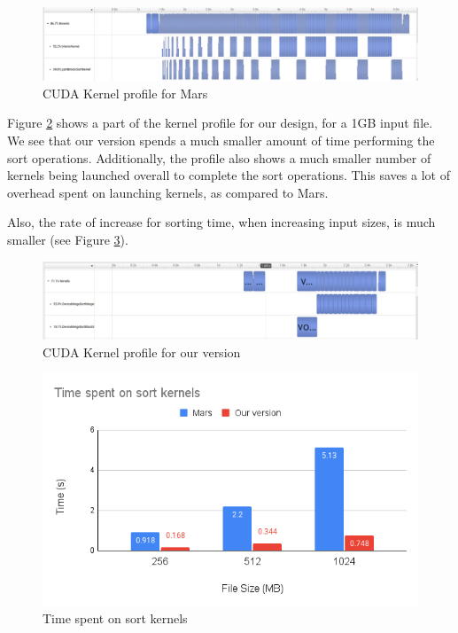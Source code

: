 \documentclass{article}
\begin{document}
\begin{figure}
    \centering
    \includegraphics[width=1\linewidth]{images/mr-mars-kernels.png}
    \caption{CUDA Kernel profile for Mars}
    \label{fig:mr-mars-kernels}
\end{figure}

Figure \ref{fig:mr-our-kernels} shows a part of the kernel profile for our design, for a 1GB input file. We see that our version spends a much smaller amount of time performing the sort operations. Additionally, the profile also shows a much smaller number of kernels being launched overall to complete the sort operations. This saves a lot of overhead spent on launching kernels, as compared to Mars.

Also, the rate of increase for sorting time, when increasing input sizes, is much smaller (see Figure \ref{fig:mr-kernels-runtimes}).

\begin{figure}
    \centering
    \includegraphics[width=1\linewidth]{images/mr-our-kernels.png}
    \caption{CUDA Kernel profile for our version}
    \label{fig:mr-our-kernels}
\end{figure}

\begin{figure}
    \centering
    \includegraphics[width=1\linewidth]{images/mr-kernels-time.png}
    \caption{Time spent on sort kernels}
    \label{fig:mr-kernels-runtimes}
\end{figure}
\end{document}
